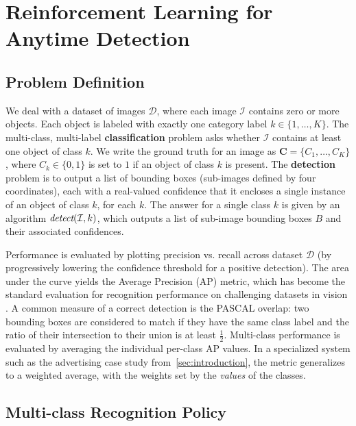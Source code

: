 \chapter{Reinforcement Learning for Anytime Detection}



\section{Problem Definition}

We deal with a dataset of images $\mathcal{D}$, where each image $\mathcal{I}$ contains zero or more objects.
Each object is labeled with exactly one category label $k \in \{1, \dots, K\}$.
The multi-class, multi-label \textbf{classification} problem asks whether $\mathcal{I}$ contains at least one object of class $k$.
We write the ground truth for an image as $\mathbf{C}=\{C_1,\dots,C_K\}$, where $C_k \in \{0,1\}$ is set to $1$ if an object of class $k$ is present.
The \textbf{detection} problem is to output a list of bounding boxes (sub-images defined by four coordinates), each with a real-valued confidence that it encloses a single instance of an object of class $k$, for each $k$.
The answer for a single class $k$ is given by an algorithm $\emph{detect}(\mathcal{I},k)$, which outputs a list of sub-image bounding boxes $B$ and their associated confidences.

Performance is evaluated by plotting precision vs. recall across dataset $\mathcal{D}$ (by progressively lowering the confidence threshold for a positive detection).
The area under the curve yields the Average Precision (AP) metric, which has become the standard evaluation for recognition performance on challenging datasets in vision \cite{pascal-voc-2010}.
A common measure of a correct detection is the PASCAL overlap: two bounding boxes are considered to match if they have the same class label and the ratio of their intersection to their union is at least $\frac{1}{2}$.
Multi-class performance is evaluated by averaging the individual per-class AP values.
In a specialized system such as the advertising case study from~\autoref{sec:introduction}, the metric generalizes to a weighted average, with the weights set by the \emph{values} of the classes.

\section{Multi-class Recognition Policy} \label{sec:tech}

